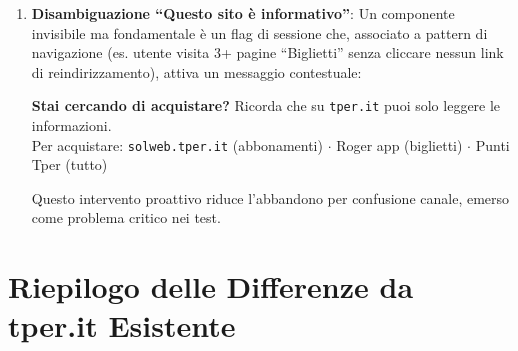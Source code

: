 \begin{tcolorbox}[colback=backgroundColor,colframe=borderColor,arc=2mm]
{\begin{enumerate}[leftmargin=*]
 \item \textbf{Disambiguazione ``Questo sito è informativo''}: Un componente invisibile ma fondamentale è un flag di sessione che, associato a pattern di navigazione (es. utente visita 3+ pagine ``Biglietti'' senza cliccare nessun link di reindirizzamento), attiva un messaggio contestuale:
 \begin{center}
 \begin{tcolorbox}[colback=accentOrange!10,colframe=accentOrange,arc=2mm,width=0.8\textwidth]
 \small \textbf{Stai cercando di acquistare?} Ricorda che su \texttt{tper.it} puoi solo leggere le informazioni. \\[2pt]
 Per acquistare: \texttt{solweb.tper.it} (abbonamenti) $\cdot$ Roger app (biglietti) $\cdot$ Punti Tper (tutto)
 \end{tcolorbox}
 \end{center}
 Questo intervento proattivo riduce l'abbandono per confusione canale, emerso come problema critico nei test.

\end{enumerate}
}
\end{tcolorbox}

\vspace{0.5cm}

\section{Riepilogo delle Differenze da tper.it Esistente}

